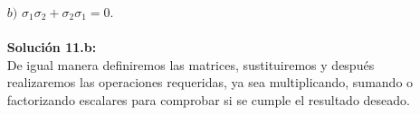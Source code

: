 \begin{itemize}
Para seguir con la soluci\'on de este ejercicio lo que haremos ser\'a realizar la multiplicaci\'on \textbf{$-i \sigma_1 \sigma_2 \sigma_3$} y usamos que la multiplicaci\'on de matrices es asociativa, al igual que el producto por escalar:\\
\[-i \sigma_1 \sigma_2 \sigma_3=-i[ (\sigma_1 \sigma_2) \sigma_3]=-i\left[\left(\begin{pmatrix} 0 & 1\\ 1 & 0\end{pmatrix} \begin{pmatrix} 0 & -i \\ i & 0\end{pmatrix}\right) \begin{pmatrix} 1 & 0 \\ 0 & -1 \end{pmatrix}\right]=-i\left[\begin{pmatrix} 0(0)+1(i) & 0(-i)+1(0)\\ 1(0)+0(i) & 1(-i)+0(0)\end{pmatrix}\begin{pmatrix} 1 & 0 \\ 0 & -1 \end{pmatrix}\right]\]\[=-i\begin{pmatrix} i & 0\\ 0 & -i\end{pmatrix} \begin{pmatrix} 1 & 0 \\ 0 & -1 \end{pmatrix}=-i(i)\begin{pmatrix} 1 & 0\\ 0 & -1\end{pmatrix} \begin{pmatrix} 1 & 0 \\ 0 & -1 \end{pmatrix} = -(-1)\sigma_3^2=I\]
Pero por lo anterior sabemos que $\sigma_3^2=I$, por tanto podemos asegurar que:
\[\sigma_1^2 = \sigma_2^2 =\sigma_3^2 = -i \sigma_1 \sigma_2 \sigma_3 = I\]\qed
    
    
\item [$b)$] $\sigma_1 \sigma_2 + \sigma_2\sigma_1 = 0.$\\\\
    \textbf{Soluci\'on 11.b:}\\
De igual manera definiremos las matrices, sustituiremos y despu\'es realizaremos las operaciones requeridas, ya sea multiplicando, sumando o factorizando escalares para comprobar si se cumple el resultado deseado.


\end{itemize}
